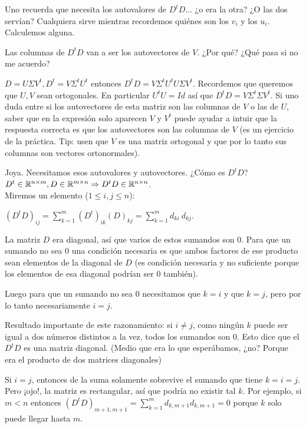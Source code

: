 \documentclass[10pt,a4paper,final]{article}
\begin{document}
Uno recuerda que necesita los autovalores de $D^t D$... ¿o era la otra? ¿O las dos servían? Cualquiera sirve mientras recordemos quiénes son los $v_i$ y los $u_i$. Calculemos alguna.

Las columnas de $D^t D$ van a ser los autovectores de $V$. ¿Por qué? ¿Qué pasa si no me acuerdo?

$D = U\Sigma V^t, D^t = V \Sigma^t U^t$ entonces $D^t D = V \Sigma^t U^t U \Sigma V^t$. Recordemos que queremos que $U,V$ sean ortogonales. En particular $U^t U = Id$ así que $D^t D = V \Sigma^t \Sigma V^t$. Si uno duda entre si los autovectores de esta matriz son las columnas de $V$ o las de $U$, saber que en la expresión solo aparecen $V$ y $V^t$ puede ayudar a intuir que la respuesta correcta es que los autovectores son las columnas de $V$ (es un ejercicio de la práctica. Tip: usen que $V$ es una matriz ortogonal y que por lo tanto sus columnas son vectores ortonormales). \bigskip

Joya. Necesitamos esos autovalores y autovectores. ¿Cómo es $D^t D$?\\

$D^t \in \mathbb{R}^{n\times m},D \in \mathbb{R}^{m\times n} \Rightarrow D^t D \in \mathbb{R}^{n\times n}$.\\

Miremos un elemento ($1\leq i,j \leq n$):

$(D^t D)_{ij} = \displaystyle\sum_{k=1}^m (D^t)_{ik} (D)_{kj} = \sum_{k=1}^m d_{ki}\ d_{kj}$.

La matriz $D$ era diagonal, así que varios de estos sumandos son $0$. Para que un sumando no sea $0$ una condición necesaria es que ambos factores de ese producto sean elementos de la diagonal de $D$ (es condición necesaria y no suficiente porque los elementos de esa diagonal podrían ser $0$ también).

Luego para que un sumando no sea $0$ necesitamos que $k=i$ y que $k=j$, pero por lo tanto necesariamente $i=j$.

Resultado importante de este razonamiento: si $i\neq j$, como ningún $k$ puede ser igual a dos números distintos a la vez, todos los sumandos son $0$. Esto dice que el $D^t D$ es una matriz diagonal. (Medio que era lo que esperábamos, ¿no? Porque era el producto de dos matrices diagonales)

Si $i=j$, entonces de la suma solamente sobrevive el sumando que tiene $k=i=j$. Pero ¡ojo!, la matriz es rectangular, así que podría no existir tal $k$. Por ejemplo, si $m<n$ entonces $(D^t D)_{m+1,m+1} = \displaystyle\sum_{k=1}^m d_{k,m+1} d_{k,m+1} = 0$ porque $k$ solo puede llegar hasta $m$.
\end{document}
